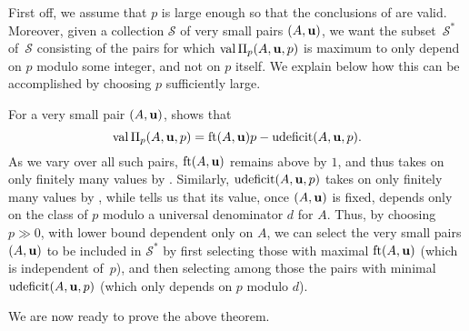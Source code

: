 \documentclass[11pt]{amsart}
\newcommand{\udeficit}{\operatorname{udeficit}}
\newcommand{\denom}{d}
\renewcommand{\S}{\mathcal{S}}
\begin{document}
\begin{remark}
   \label{p large m-primary: R}
   First off, we assume that $p$ is large enough so that the conclusions of  are valid.
   Moreover, given a collection $\S$ of very small pairs $(A,\mathbf{u})$, we want the subset~$\S^*$ of~$\S$ consisting of the pairs for which $\operatorname{val} \Pi_p(A,\mathbf{u},p)$ is maximum to only depend on $p$ modulo some integer, and not on $p$ itself.
   We explain below how this can be accomplished by choosing $p$ sufficiently large.

   For a very small pair $(A,\mathbf{u})$,  shows that
   \[ \val \IP_p(A,\vv{u},p) = \ft{A}{\vv{u}}p-\udeficit(A,\vv{u},p).\]
   As we vary over all such pairs, $\operatorname{ft}(A, \mathbf{u})$ remains above by $1$, and thus takes on only finitely many values by .
   Similarly, $\udeficit(A,\vv{u},p)$ takes on only finitely many values by , while  tells us that its value, once $(A,\mathbf{u})$ is fixed, depends only on the class of $p$ modulo a universal denominator $\denom$ for $A$.
   Thus, by choosing $p\gg 0$, with lower bound dependent only on $A$, we can select the very small pairs $(A,\mathbf{u})$ to be included in $\S^*$ by first selecting those with maximal $\operatorname{ft}(A, \mathbf{u})$ (which is independent of~$p$), and then selecting among those the pairs with minimal $\udeficit(A,\vv{u},p)$ (which only depends on $p$ modulo $\denom$).
\end{remark}

We are now ready to prove the above theorem.
\end{document}
